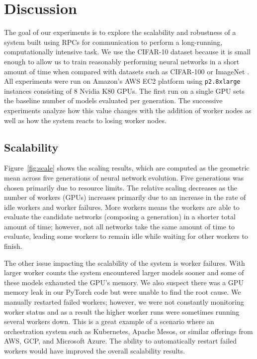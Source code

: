 \documentclass[conference]{IEEEtran}
\begin{document}
\section{Discussion}
The goal of our experiments is to explore the scalability and robustness
of a system built using RPCs for communication to perform a long-running,
computationally intensive task. We use the CIFAR-10 \cite{cifar10-data}
dataset because it is small enough to allow us to train reasonably
performing neural networks in a short amount of time when compared with
datasets such as CIFAR-100 \cite{cifar100-data} or ImageNet \cite{imagenet_cvpr09}.
All experiments were run on Amazon's
AWS EC2 platform using \texttt{p2.8xlarge} instances consisting of 8
Nvidia K80 GPUs. The first run on a single GPU sets the baseline
number of models evaluated per generation. The successive experiments
analyze how this value changes with the addition of worker nodes as well
as how the system reacts to losing worker nodes.
\subsection{Scalability}
Figure~\ref{fig:scale} shows the scaling results, which are computed as the
geometric mean across five generations of neural network evolution. Five
generations was chosen primarily due to resource limits. The relative scaling
decreases as the number of workers (GPUs) increases primarily due to an
increase in the rate of idle workers and worker failures. More workers
means the workers are able to evaluate the candidate networks (composing a
generation) in a shorter total amount of time; however, not all networks
take the same amount of time to evaluate, leading some workers to remain
idle while waiting for other workers to finish.

The other issue impacting the scalability of the system is worker
failures. With larger worker counts the system encountered larger models
sooner and some of these models exhausted the GPU's memory. We also
suspect there was a GPU memory leak in our PyTorch code but were unable
to find the root cause. We manually restarted failed workers; however,
we were not constantly monitoring worker status and as a result the higher
worker runs were sometimes running several workers down. This is a great
example of a scenario where an orchestration system such as Kubernetes,
Apache Mesos, or similar offerings from AWS, GCP, and Microsoft Azure.
The ability to automatically restart failed workers would have improved
the overall scalability results.
\end{document}
